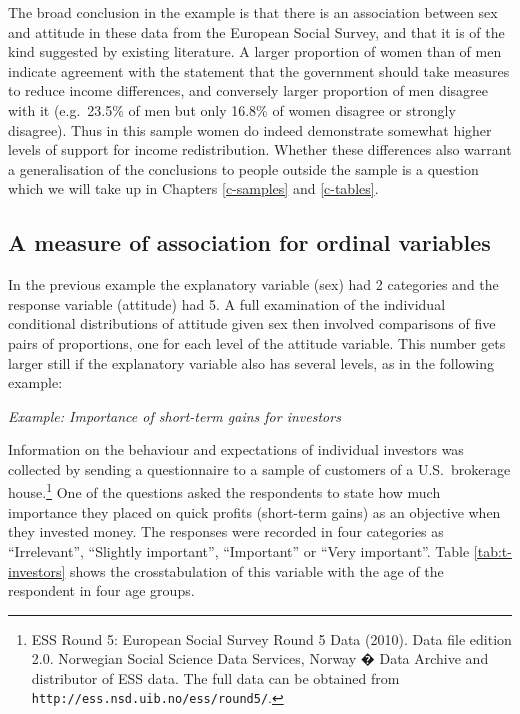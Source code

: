 \documentclass[11pt,a4paper,openany]{book}
\let\rmarkdownfootnote\footnote%
\def\footnote{\protect\rmarkdownfootnote}
\begin{document}
The broad conclusion in the example is that there is an association
between sex and attitude in these data from the European Social Survey,
and that it is of the kind suggested by existing literature. A larger
proportion of women than of men indicate agreement with the statement
that the government should take measures to reduce income differences,
and conversely larger proportion of men disagree with it (e.g.~23.5\% of
men but only 16.8\% of women disagree or strongly disagree). Thus in
this sample women do indeed demonstrate somewhat higher levels of
support for income redistribution. Whether these differences also
warrant a generalisation of the conclusions to people outside the sample
is a question which we will take up in Chapters \ref{c-samples} and
\ref{c-tables}.

\subsection{A measure of association for ordinal
variables}\label{ss-descr1-2cat-gamma}

In the previous example the explanatory variable (sex) had 2 categories
and the response variable (attitude) had 5. A full examination of the
individual conditional distributions of attitude given sex then involved
comparisons of five pairs of proportions, one for each level of the
attitude variable. This number gets larger still if the explanatory
variable also has several levels, as in the following example:

\emph{Example: Importance of short-term gains for investors}

Information on the behaviour and expectations of individual investors
was collected by sending a questionnaire to a sample of customers of a
U.S.~brokerage house.\footnote{ESS Round 5: European Social Survey Round
  5 Data (2010). Data file edition 2.0. Norwegian Social Science Data
  Services, Norway � Data Archive and distributor of ESS data. The full
  data can be obtained from \texttt{http://ess.nsd.uib.no/ess/round5/}.}
One of the questions asked the respondents to state how much importance
they placed on quick profits (short-term gains) as an objective when
they invested money. The responses were recorded in four categories as
``Irrelevant'', ``Slightly important'', ``Important'' or ``Very
important''. Table \ref{tab:t-investors} shows the crosstabulation of
this variable with the age of the respondent in four age groups.
\end{document}
